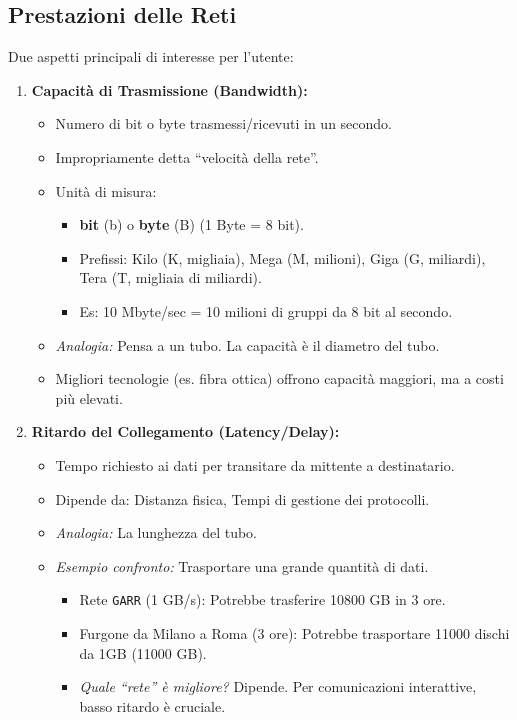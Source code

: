 \subsection{Prestazioni delle Reti}
Due aspetti principali di interesse per l'utente:
\begin{enumerate}
    \item \textbf{Capacità di Trasmissione (Bandwidth):}
    \begin{itemize}
        \item Numero di bit o byte trasmessi/ricevuti in un secondo.
        \item Impropriamente detta “velocità della rete”.
        \item Unità di misura:
        \begin{itemize}
            \item \textbf{bit} (b) o \textbf{byte} (B) (1 Byte = 8 bit).
            \item Prefissi: Kilo (K, migliaia), Mega (M, milioni), Giga (G, miliardi), Tera (T, migliaia di miliardi).
            \item Es: 10 Mbyte/sec = 10 milioni di gruppi da 8 bit al secondo.
        \end{itemize}
        \item \textit{Analogia:} Pensa a un tubo. La capacità è il diametro del tubo.
        \item Migliori tecnologie (es. fibra ottica) offrono capacità maggiori, ma a costi più elevati.
    \end{itemize}
    \item \textbf{Ritardo del Collegamento (Latency/Delay):}
    \begin{itemize}
        \item Tempo richiesto ai dati per transitare da mittente a destinatario.
        \item Dipende da: Distanza fisica, Tempi di gestione dei protocolli.
        \item \textit{Analogia:} La lunghezza del tubo.
        \item \textit{Esempio confronto:} Trasportare una grande quantità di dati.
        \begin{itemize}
            \item Rete \texttt{GARR} (1 GB/s): Potrebbe trasferire 10800 GB in 3 ore.
            \item Furgone da Milano a Roma (3 ore): Potrebbe trasportare 11000 dischi da 1GB (11000 GB).
            \item \textit{Quale “rete” è migliore?} Dipende. Per comunicazioni interattive, basso ritardo è cruciale.
        \end{itemize}
    \end{itemize}
\end{enumerate}
